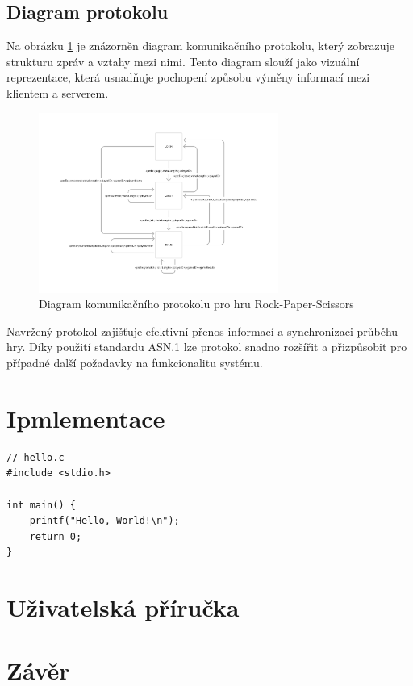 \documentclass[12pt, a4paper]{article}
\begin{document}
\subsection{Diagram protokolu}

Na obrázku \ref{fig:protocol} je znázorněn diagram komunikačního protokolu, který zobrazuje strukturu zpráv a vztahy mezi nimi. Tento diagram slouží jako vizuální reprezentace, která usnadňuje pochopení způsobu výměny informací mezi klientem a serverem.

\begin{figure}[H]
    \centering
    \includegraphics[width=0.7\textwidth]{img/protocol.png}
    \caption{Diagram komunikačního protokolu pro hru Rock-Paper-Scissors}
    \label{fig:protocol}
\end{figure}

Navržený protokol zajišťuje efektivní přenos informací a synchronizaci průběhu hry. Díky použití standardu ASN.1 lze protokol snadno rozšířit a přizpůsobit pro případné další požadavky na funkcionalitu systému.


\section{Ipmlementace}

\begin{lstlisting}
// hello.c
#include <stdio.h>

int main() {
    printf("Hello, World!\n");
    return 0;
}
\end{lstlisting}


\section{Uživatelská příručka}


\section{Závěr}
\end{document}
